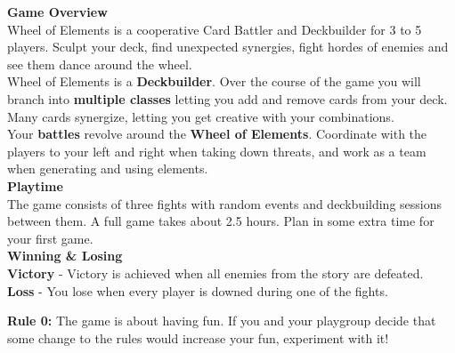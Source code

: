 \maketitle


\begin{minipage}[t][15.5cm][t]{0.5\textwidth}
	\begin{minipage}[t][14cm][t]{0.9\textwidth}
		\textbf{Game Overview}\\
		Wheel of Elements is a cooperative Card Battler and Deckbuilder for 3 to 5 players. Sculpt your deck, find unexpected synergies, fight hordes of enemies and see them dance around the wheel.\\
		
		Wheel of Elements is a \textbf{Deckbuilder}. Over the course of the game you will branch into \textbf{multiple classes} letting you add and remove cards from your deck. Many cards synergize, letting you get creative with your combinations. \\
		
		Your \textbf{battles} revolve around the \textbf{Wheel of Elements}. Coordinate with the players to your left and right when taking down threats, and work as a team when generating and using elements. \\
		
		\textbf{Playtime}\\
		The game consists of three fights with random events and deckbuilding sessions between them. A full game takes about 2.5 hours. Plan in some extra time for your first game.\\
		
		\textbf{Winning \& Losing}\\
		\textbf{Victory} - Victory is achieved when all enemies from the story are defeated.\\
		\textbf{Loss} - You lose when every player is downed during one of the fights.\\
		
		\begin{tcolorbox}[colframe=black, colback=white]
			\textbf{Rule 0:} The game is about having fun. If you and your playgroup decide that some change to the rules would increase your fun, experiment with it!
		\end{tcolorbox}
	\end{minipage}
\end{minipage}
\begin{minipage}[t][12cm][t]{0.5\textwidth}
	\setlength{\cftbeforetoctitleskip}{-0.5em}
	\setlength{\cftbeforesecskip}{0em}
	\tableofcontents
	
\end{minipage}
